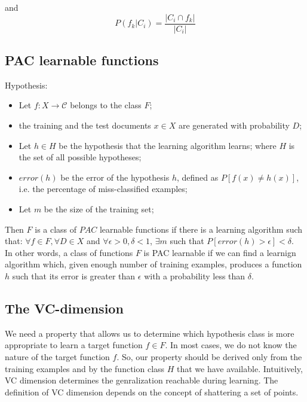 and 
\begin{equation*}
	P(f_k|C_i) = 
	\frac{|C_i \cap f_k|}
	{|C_i|}
\end{equation*}

\subsection{PAC learnable functions}

Hypothesis:
\begin{itemize}
	\item Let $f: X \rightarrow \mathcal{C}$ belongs to the class $F$;

	\item the training and the test documents $x \in X$ are generated with
		probability $D$;

	\item Let $h \in H$ be the hypothesis that the learning algorithm learns;
		where $H$ is the set of all possible hypotheses;

	\item $error(h)$ be the error of the hypothesis $h$, defined as $P[f(x) \neq
		h(x)]$, i.e. the percentage of miss-classified examples;

	\item Let $m$ be the size of the training set;
\end{itemize}

Then $F$ is a class of $PAC$ learnable functions if there is a learning
algorithm such that: $\forall f \in F, \forall D \in X$ and $\forall \epsilon >
0, \delta < 1$, $\exists m$ such that $P[error(h) > \epsilon] < \delta$.\\
In other words, a class of functions $F$ is PAC learnable if we can find a
learnign algorithm which, given enough number of training examples, produces a
function $h$ such that its error is greater than $\epsilon$ with a probability
less than $\delta$.

\subsection{The VC-dimension}

We need a property that allows us to determine which hypothesis class is more
appropriate to learn a target function $f \in F$. In most cases, we do not know
the nature of the target function $f$. So, our property should be derived only
from the training examples and by the function class $H$ that we have available.
Intuitively, VC dimension determines the genralization reachable during
learning. The definition of VC dimension depends on the concept of shattering a
set of points.

